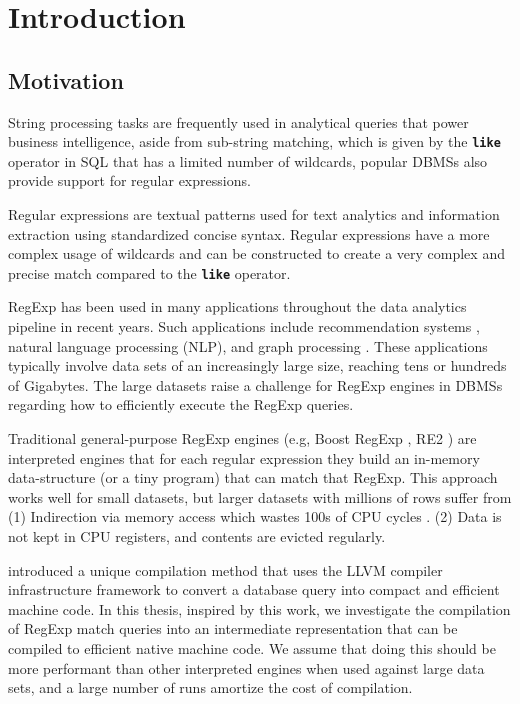 
\chapter{Introduction}\label{chapter:introduction}

\section{Motivation}
String processing tasks are frequently used in analytical queries that power business intelligence, aside from sub-string matching, which is given by the \texttt{\textbf{like}} operator in SQL that has a limited number of wildcards, popular DBMSs also provide support for regular expressions.

Regular expressions are textual patterns used for text analytics and information extraction using standardized concise syntax. Regular expressions have a more complex usage of wildcards and can be constructed to create a very complex and precise match compared to the \texttt{\textbf{like}} operator.

RegExp has been used in many applications throughout the data analytics pipeline in recent years. Such applications include recommendation systems \cite{recsys1}, natural language processing (NLP), \cite{nlp1, nlp2} and graph processing \cite{graph1}. These applications typically involve data sets of an increasingly large size, reaching tens or hundreds of Gigabytes. The large datasets raise a challenge for RegExp engines in DBMSs regarding how to efficiently execute the RegExp queries.

Traditional general-purpose RegExp engines (e.g, Boost RegExp \cite{Boost}, RE2 \cite{re2}) are interpreted engines  that for each regular expression they build an in-memory data-structure (or a tiny program) that can match that RegExp. This approach works well for small datasets, but larger datasets with millions of rows suffer from (1) Indirection via memory access which wastes 100s of CPU cycles \cite{cpumemgap}. (2) Data is not kept in CPU registers, and contents are evicted regularly.

\citet{querycomp} introduced a unique compilation method that uses the LLVM \cite{llvm} compiler infrastructure framework to convert a database query into compact and efficient machine code. In this thesis, inspired by this work, we investigate the compilation of RegExp match queries into an intermediate representation that can be compiled to efficient native machine code. We assume that doing this should be more performant than other interpreted engines when used against large data sets, and a large number of runs amortize the cost of compilation.

